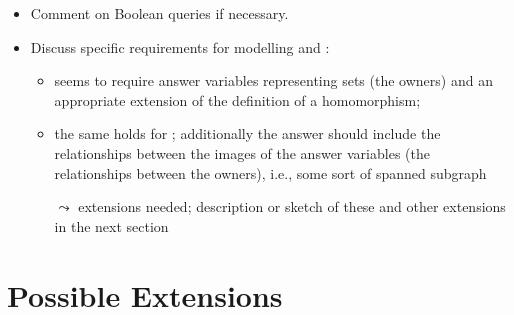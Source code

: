 %
\begin{itemize}
  \item
    Comment on Boolean queries if necessary.
  \item
    Discuss specific requirements for modelling  and : 
    \begin{itemize}
      \item 
         seems to require answer variables representing sets (the owners)
        and an appropriate extension of the definition of a homomorphism;
      \item 
        the same holds for ; additionally the answer should include the relationships
        between the images of the answer variables (the relationships between the owners),
        i.e., some sort of spanned subgraph
      \item[$\leadsto$]
        extensions needed; description or sketch of these and other extensions in the next section
    \end{itemize}
\end{itemize}



\section{Possible Extensions}
\label{sec:possible_extensions}

